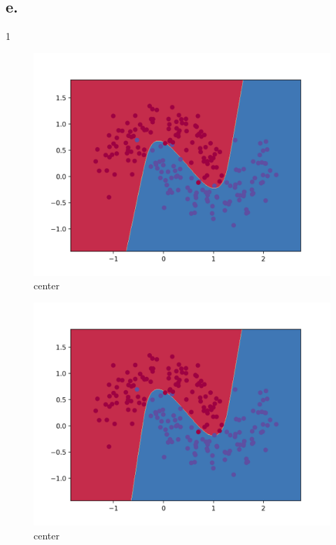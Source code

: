 \documentclass[12pt]{article}
\begin{document}
 

\subsection{e.}
1
\begin{figure}[H]
  \caption{center}
  \centering
    \includegraphics[scale=0.2]{tanh.png}
\end{figure}
\begin{figure}[H]
  \caption{center}
  \centering
    \includegraphics[scale=0.2]{sig.png}
\end{figure}
\end{document}
